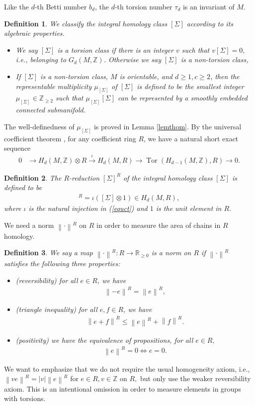 \documentclass[11pt,a4paper]{amsart}
\numberwithin{equation}{section}
\newcommand{\Si}{\Sigma}
\newcommand{\no}[1]{\left\lVert#1\right\rVert}
\newcommand{\ts}{\otimes}
\newcommand{\R}{\mathbb{R}}
\newcommand{\Z}{\mathbb{Z}}
\newcommand{\eq}{\Leftrightarrow}
\theoremstyle{plain}
\newtheorem{defn}{Definition}[subsection]
\theoremstyle{definition}
\numberwithin{equation}{subsection}
\begin{document}
Like the $d$-th Betti number $b_d$, the $d$-th torsion number $\tau_d$ is an invariant of $M.$\begin{defn}We classify the integral homology class $[\Si]$ according to its algebraic properties.\label{defnhom}
\begin{itemize}
\item 	We say $[\Si]$ is a torsion class if there is an integer $v$ such that $v[\Si]=0,$ i.e., belonging to $G_d(M,\Z)$. Otherwise we say $[\Si]$ is a non-torsion class,
\item If $[\Si]$ is a non-torsion class, $M$ is orientable, and $d\ge1 ,c\ge 2$, then the representable multiplicity $\mu_{[\Si]}$ of $[\Si]$ is defined to be the smallest integer $\mu_{[\Si]}\in\Z_{\ge 2}$ such that $\mu_{[\Si]}[\Si]$ can be represented by a smoothly embedded connected submanifold.
\end{itemize}
\end{defn}		
The well-definedness of $\mu_{[\Si]}$ is proved in Lemma \ref{lemthom}. 
By the universal coefficient theorem \cite[Theorem 3A.3]{AH}, for any coefficient ring $R$, we have a natural short exact sequence
\begin{align}\label{equct}
	0&\rightarrow H_d(M,\Z)\ts R\overset{\iota}{\rightarrow} H_d(M,R)\rightarrow\operatorname{Tor}(H_{d-1}(M,\Z),R)\to 0.
\end{align} 
\begin{defn}\label{defni}
	The $R$-reduction $[\Si]^R$ of the integral homology class $[\Si]$ is defined to be
	\begin{align*}
		[\Si]^R=\iota([\Si]\ts 1)\in H_d(M,R),
	\end{align*}where $\iota$ is the natural injection in (\ref{equct}) and $1$ is the unit element in $R.$ \end{defn}

	We need a norm $\no{\cdot}^R$ on $R$ in order to measure the area of chains in $R$ homology. 
	\begin{defn}\label{defnnm}
		We say a map $\no{\cdot }^R:R\to \R_{\ge0}$ is a norm on $R$ if $\no{\cdot}^R$ satisfies the following three properties:
		\begin{itemize}
			\item (reversibility) for all $e\in R$, we have
			\begin{align*}
				\no{-e}^R=\no{e}^R,
			\end{align*}
			\item (triangle inequality) for all $e,f\in R$, we have
			\begin{align*}
				\no{e+f}^R\le \no{e}^R+\no{f}^R.
			\end{align*}
			\item (positivity) we have the equivalence of propositions, for all $e\in R,$
			\begin{align*}
				\no{e}^R=0\eq e=0. 
			\end{align*} 
		\end{itemize}
	\end{defn}We want to emphasize that we do not require the usual homogeneity axiom, i.e., $\no{ve}^R=|v|\no{e}^R$ for $e\in R,v\in\Z$ on $R,$ but only use the weaker reversibility axiom. This is an intentional omission in order to measure elements in groups with torsions. 
	
\end{document}
